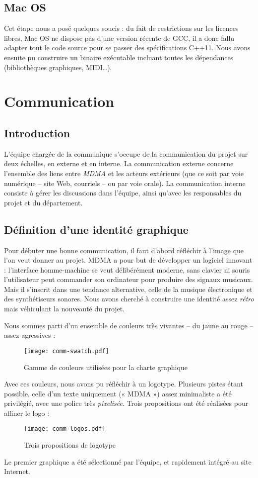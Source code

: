 \subsection{Mac OS}
\par Cet étape nous a posé quelques soucis : du fait de restrictions sur les licences libres, Mac OS ne dispose pas d'une version récente de GCC, il a donc fallu adapter tout le code source pour se passer des spécifications C++11. Nous avons ensuite pu construire un binaire exécutable incluant toutes les dépendances (bibliothèques graphiques, MIDI…).
\section{Communication}
\subsection{Introduction}
\par L'équipe chargée de la communique s'occupe de la communication du projet sur deux échelles, en externe et en interne. La communication externe concerne l'ensemble des liens entre \emph{MDMA} et les acteurs extérieurs (que ce soit par voie numérique -- site Web, courriels -- ou par voie orale). La communication interne consiste à gérer les discussions dans l'équipe, ainsi qu'avec les responsables du projet et du département.
\subsection{Définition d'une identité graphique}
\par Pour débuter une bonne communication, il faut d'abord réfléchir à l'image que l'on veut donner au projet. MDMA a pour but de développer un logiciel innovant : l'interface homme-machine se veut délibérément moderne, sans clavier ni souris l'utilisateur peut commander son ordinateur pour produire des signaux musicaux. Mais il s'inscrit dans une tendance alternative, celle de la musique électronique et des synthétiseurs sonores. Nous avons cherché à construire une identité assez \emph{rétro} mais véhiculant la nouveauté du projet.
\par Nous sommes parti d'un ensemble de couleurs très vivantes -- du jaune au rouge -- assez agressives :
\begin{figure}[h]
  \centering
  \texttt{[image: comm-swatch.pdf]}
  \caption{Gamme de couleurs utilisées pour la charte graphique}
  \label{fig:swatch}
\end{figure}
\par Avec ces couleurs, nous avons pu réfléchir à un logotype. Plusieurs pistes étant possible, celle d'un texte uniquement (« MDMA ») assez minimaliste a été privilégié, avec une police très \emph{pixelisée}. Trois propositions ont été réalisées pour affiner le logo :
\begin{figure}[h]
  \centering
    \texttt{[image: comm-logos.pdf]}
  \caption{Trois propositions de logotype}
  \label{fig:Logos-MDMA}
\end{figure}
\par Le premier graphique a été sélectionné par l'équipe, et rapidement intégré au site Internet.
